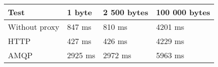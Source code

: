 \begin{tabularx}{\textwidth}{llll}
\hline
 Test          & 1 byte   & 2 500 bytes   & 100 000 bytes   \\
\hline
 Without proxy & 847 ms   & 810 ms        & 4201 ms         \\
 HTTP          & 427 ms   & 426 ms        & 4229 ms         \\
 AMQP          & 2925 ms  & 2972 ms       & 5963 ms         \\
\hline
\end{tabularx}